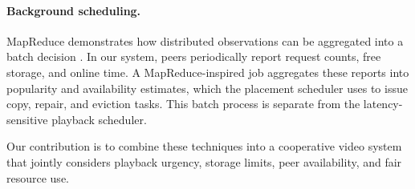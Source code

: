 \paragraph{Background scheduling.} MapReduce demonstrates how distributed observations can be aggregated into a batch decision \cite{dean2004mapreduce}. In our system, peers periodically report request counts, free storage, and online time. A MapReduce-inspired job aggregates these reports into popularity and availability estimates, which the placement scheduler uses to issue copy, repair, and eviction tasks. This batch process is separate from the latency-sensitive playback scheduler.

Our contribution is to combine these techniques into a cooperative video system that jointly considers playback urgency, storage limits, peer availability, and fair resource use.






